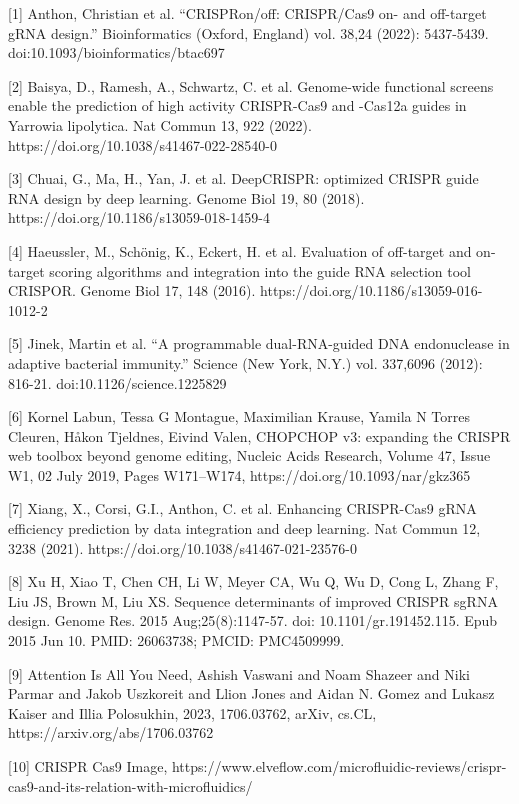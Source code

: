 \documentclass{article}
\begin{document}
\small
\label{Reference 1} [1] Anthon, Christian et al. “CRISPRon/off: CRISPR/Cas9 on- and off-target gRNA design.” Bioinformatics (Oxford, England) vol. 38,24 (2022): 5437-5439. doi:10.1093/bioinformatics/btac697 

\label{Reference 2} [2] Baisya, D., Ramesh, A., Schwartz, C. et al. Genome-wide functional screens enable the prediction of high activity CRISPR-Cas9 and -Cas12a guides in Yarrowia lipolytica. Nat Commun 13, 922 (2022). https://doi.org/10.1038/s41467-022-28540-0

\label{Reference 3} [3] Chuai, G., Ma, H., Yan, J. et al. DeepCRISPR: optimized CRISPR guide RNA design by deep learning. Genome Biol 19, 80 (2018). https://doi.org/10.1186/s13059-018-1459-4

\label{Reference 4} [4] Haeussler, M., Schönig, K., Eckert, H. et al. Evaluation of off-target and on-target scoring algorithms and integration into the guide RNA selection tool CRISPOR. Genome Biol 17, 148 (2016). https://doi.org/10.1186/s13059-016-1012-2

\label{Reference 5} [5] Jinek, Martin et al. “A programmable dual-RNA-guided DNA endonuclease in adaptive bacterial immunity.” Science (New York, N.Y.) vol. 337,6096 (2012): 816-21. doi:10.1126/science.1225829

\label{Reference 6} [6] Kornel Labun, Tessa G Montague, Maximilian Krause, Yamila N Torres Cleuren, Håkon Tjeldnes, Eivind Valen, CHOPCHOP v3: expanding the CRISPR web toolbox beyond genome editing, Nucleic Acids Research, Volume 47, Issue W1, 02 July 2019, Pages W171–W174, https://doi.org/10.1093/nar/gkz365

\label{Reference 7} [7] Xiang, X., Corsi, G.I., Anthon, C. et al. Enhancing CRISPR-Cas9 gRNA efficiency prediction by data integration and deep learning. Nat Commun 12, 3238 (2021). https://doi.org/10.1038/s41467-021-23576-0

\label{Reference 8} [8] Xu H, Xiao T, Chen CH, Li W, Meyer CA, Wu Q, Wu D, Cong L, Zhang F, Liu JS, Brown M, Liu XS. Sequence determinants of improved CRISPR sgRNA design. Genome Res. 2015 Aug;25(8):1147-57. doi: 10.1101/gr.191452.115. Epub 2015 Jun 10. PMID: 26063738; PMCID: PMC4509999. 

\label{Reference 9} [9] Attention Is All You Need, Ashish Vaswani and Noam Shazeer and Niki Parmar and Jakob Uszkoreit and Llion Jones and Aidan N. Gomez and Lukasz Kaiser and Illia Polosukhin, 2023, 1706.03762, arXiv, cs.CL, https://arxiv.org/abs/1706.03762

\label{Reference 10} [10] CRISPR Cas9 Image, https://www.elveflow.com/microfluidic-reviews/crispr-cas9-and-its-relation-with-microfluidics/
\end{document}
